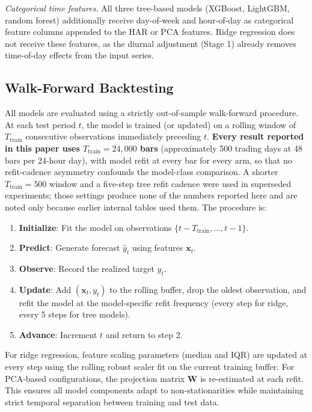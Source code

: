 \medskip

\noindent\textit{Categorical time features.} All three tree-based models (XGBoost, LightGBM, random forest) additionally receive day-of-week and hour-of-day as categorical feature columns appended to the HAR or PCA features. Ridge regression does not receive these features, as the diurnal adjustment (Stage 1) already removes time-of-day effects from the input series.

\subsection{Walk-Forward Backtesting}
\label{sec:backtest}

All models are evaluated using a strictly out-of-sample walk-forward procedure. At each test period $t$, the model is trained (or updated) on a rolling window of $T_{\mathrm{train}}$ consecutive observations immediately preceding $t$. \textbf{Every result reported in this paper uses $T_{\mathrm{train}} = 24{,}000$ bars} (approximately 500 trading days at 48 bars per 24-hour day), with model refit at every bar for every arm, so that no refit-cadence asymmetry confounds the model-class comparison. A shorter $T_{\mathrm{train}} = 500$ window and a five-step tree refit cadence were used in superseded experiments; those settings produce none of the numbers reported here and are noted only because earlier internal tables used them. The procedure is:

\begin{enumerate}
    \item \textbf{Initialize}: Fit the model on observations $\{t - T_{\mathrm{train}}, \ldots, t-1\}$.
    \item \textbf{Predict}: Generate forecast $\hat{y}_{t}$ using features $\mathbf{x}_t$.
    \item \textbf{Observe}: Record the realized target $y_t$.
    \item \textbf{Update}: Add $(\mathbf{x}_t, y_t)$ to the rolling buffer, drop the oldest observation, and refit the model at the model-specific refit frequency (every step for ridge, every 5 steps for tree models).
    \item \textbf{Advance}: Increment $t$ and return to step 2.
\end{enumerate}

For ridge regression, feature scaling parameters (median and IQR) are updated at every step using the rolling robust scaler fit on the current training buffer. For PCA-based configurations, the projection matrix $\mathbf{W}$ is re-estimated at each refit. This ensures all model components adapt to non-stationarities while maintaining strict temporal separation between training and test data.

